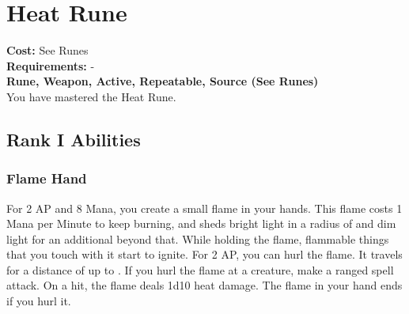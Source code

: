 \section{Heat Rune}\label{rune:heat}
\textbf{Cost:} See Runes\\
\textbf{Requirements:} -\\
\textbf{Rune, Weapon, Active, Repeatable, Source (See Runes)}\\
You have mastered the Heat Rune.

\subsection{Rank I Abilities}

\subsubsection{Flame Hand}
For 2 AP and 8 Mana, you create a small flame in your hands.
This flame costs 1 Mana per Minute to keep burning, and sheds bright light in a radius of  and dim light for an additional  beyond that.
While holding the flame, flammable things that you touch with it start to ignite.
For 2 AP, you can hurl the flame.
It travels for a distance of up to .
If you hurl the flame at a creature, make a ranged spell attack.
On a hit, the flame deals 1d10 heat damage.
The flame in your hand ends if you hurl it.